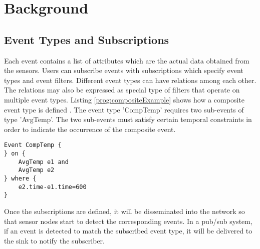 \section{Background}
\label{sec:background}
\begin{comment}
We first briefly overview the issues in event subscription and event detection.
\end{comment}
\subsection{Event Types and Subscriptions}
Each event contains a list of attributes which are the actual data obtained from the sensors. Users can subscribe events with subscriptions which specify event types and event filters. Different event types can have relations among each other. The relations may also be expressed as special type of filters that operate on multiple event types. Listing \ref{prog:compositeExample} shows how a composite event type is defined \cite{lai:psware}. The event type 'CompTemp' requires two sub-events of type 'AvgTemp'. The two sub-events must satisfy certain temporal constraints in order to indicate the occurrence of the composite event.
\begin{lstlisting}[caption=Example of a composite event, label=prog:compositeExample]
Event CompTemp {
} on {
    AvgTemp e1 and
    AvgTemp e2
} where {
    e2.time-e1.time=600
}
\end{lstlisting}
\begin{comment}
Mathematically, event types together with their relations can be represented by a directed acyclic graph, where each node represents an event and each edge represents a relation. The nodes with 0 indegree represent primitive event types which are the events that can be directly obtained from individual sensor nodes. The rest of the nodes represent composite event types. The event type which has 0 outdegree is the subscribed event type.
\end{comment}
Once the subscriptions are defined, it will be disseminated into the network so that sensor nodes start to detect the corresponding events. In a pub/sub system, if an event is detected to match the subscribed event type, it will be delivered to the sink to notify the subscriber.

